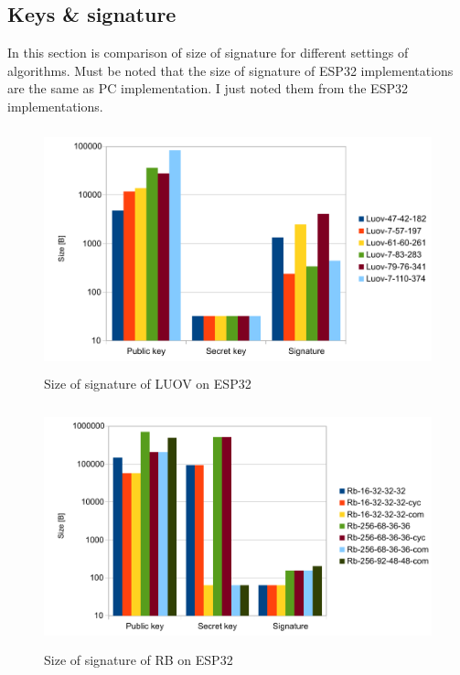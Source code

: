 \documentclass[thesis=M,english]{FITthesis}[2019/12/23]
\begin{document}
\subsection{Keys \& signature} \label{key_sign}
In this section is comparison of size of signature for different settings of algorithms. Must be noted that the size of signature of ESP32 implementations are the same as PC implementation. I just noted them from the ESP32 implementations.
\begin{figure}[H]
\centering
\includegraphics[width=13cm,height=7cm]{images/sign-luov.pdf}
\caption{Size of signature of LUOV on ESP32}
\label{sign-luov}
\end{figure}

\begin{figure}[H]
\centering
\includegraphics[width=13cm,height=7cm]{images/sign-rb.pdf}
\caption{Size of signature of RB on ESP32}
\label{sign-rb}
\end{figure}
\end{document}
